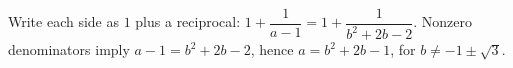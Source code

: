 Write each side as $1$ plus a reciprocal: $1+\dfrac{1}{a-1}=1+\dfrac{1}{b^2+2b-2}$. Nonzero denominators imply $a-1=b^2+2b-2$, hence $\boxed{a=b^2+2b-1}$, for $b\ne-1\pm\sqrt3$.

